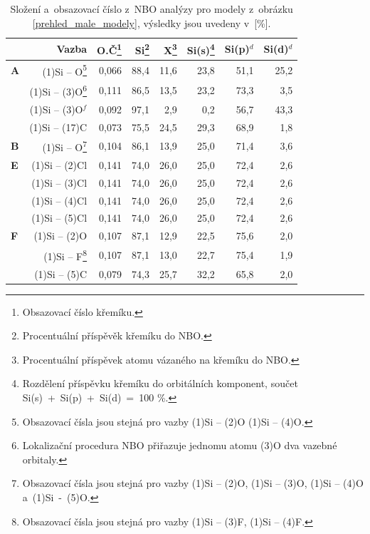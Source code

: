 \documentclass[
digital, %
table,   %
nolof,     %
nolot,     %
oneside,
]{fithesis3}
\begin{document}
\begin{table}[H]
\begin{minipage}{\textwidth}
\caption{Složení a~obsazovací číslo z~NBO analýzy pro modely z~obrázku \ref{prehled_male_modely}, výsledky jsou uvedeny v~[\%].}
\begin{center}
\begin{tabular}{|l|r|r|r|r|r|r|r|}
\hline
\label{nbo_small} &  Vazba & O.Č\footnote{Obsazovací číslo křemíku.} & Si\footnote{Procentuální příspěvěk křemíku do NBO.} & X\footnote{Procentuální příspěvek atomu vázaného na křemíku do NBO.} & Si(s)\footnote{Rozdělení příspěvku křemíku do orbitálních komponent, součet Si(s)~+~Si(p)~+~Si(d)~=~100 \%.} & Si(p)$^d$ &Si(d)$^d$ \\ \hline
\textbf{A} & (1)Si -- O\footnote{ Obsazovací čísla jsou stejná pro vazby (1)Si -- (2)O (1)Si -- (4)O.}  & 0,066 & 88,4  & 11,6  & 23,8  & 51,1  & 25,2  \\ \hline
&  (1)Si -- (3)O\footnote{Lokalizační procedura NBO přiřazuje jednomu atomu (3)O dva vazebné orbitaly.} & 0,111 & 86,5  & 13,5  & 23,2  & 73,3  & 3,5  \\ \hline
&  (1)Si -- (3)O$^f$ & 0,092 & 97,1  & 2,9  & 0,2  & 56,7  & 43,3  \\ \hline
& (1)Si -- (17)C & 0,073 & 75,5  & 24,5  & 29,3  & 68,9  & 1,8  \\ \hline
\textbf{B} & (1)Si -- O\footnote{Obsazovací čísla jsou stejná pro vazby (1)Si -- (2)O, (1)Si -- (3)O, (1)Si -- (4)O a~(1)Si~-~(5)O.}  & 0,104 & 86,1  & 13,9  & 25,0  & 71,4  & 3,6  \\ \hline
\textbf{E} & (1)Si -- (2)Cl & 0,141 & 74,0  & 26,0  & 25,0  & 72,4  & 2,6  \\ \hline
&  (1)Si -- (3)Cl& 0,141 & 74,0  & 26,0  & 25,0  & 72,4  & 2,6  \\ \hline
& (1)Si -- (4)Cl & 0,141 & 74,0  & 26,0  & 25,0  & 72,4  & 2,6  \\ \hline
&  (1)Si -- (5)Cl & 0,141 & 74,0  & 26,0  & 25,0  & 72,4  & 2,6  \\ \hline
\textbf{F}  & (1)Si -- (2)O &0,107 & 87,1  & 12,9  & 22,5  & 75,6  & 2,0  \\ \hline
& (1)Si -- F\footnote{ Obsazovací čísla jsou stejná pro vazby (1)Si -- (3)F, (1)Si -- (4)F.} & 0,107 & 87,1  & 13,0  & 22,7  & 75,4  & 1,9  \\ \hline
& (1)Si -- (5)C &0,079 & 74,3  & 25,7  & 32,2  & 65,8  & 2,0  \\ \hline
\end{tabular}
\end{center}
\end{minipage}
\end{table}
\end{document}
